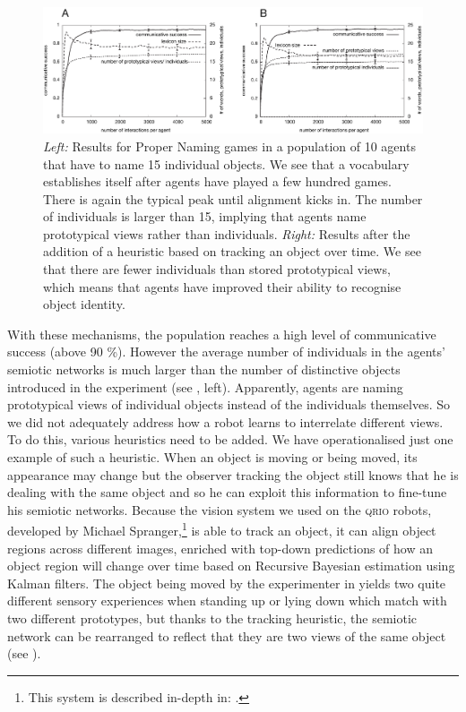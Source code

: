 \begin{figure}[htbp]
  \centerline{\includegraphics[width=\textwidth]{chap11/figs/png-results.pdf}}
\caption{\label{fig:png-results} 
{\itshape Left:} Results for Proper Naming games in a population of 10 agents that have to name 15 individual objects. 
We see that a vocabulary establishes
itself after agents have played a few hundred games. There is again the typical peak until alignment kicks in. 
The number of individuals is larger than 15, implying that agents name prototypical views rather than 
individuals. {\itshape Right:} Results after the addition  
of a heuristic based on tracking an object over time. We see that there are fewer individuals 
than stored prototypical views, which means that agents have improved their ability to recognise object 
identity. }
\end{figure}
With these mechanisms, the population reaches a high level of communicative success (above 90 \%). 
However the average number of individuals in the agents' semiotic networks
is much larger than the number of distinctive objects
introduced in the experiment (see , left). Apparently, agents are naming prototypical views of
individual objects instead of the individuals themselves. So we did not adequately address 
how a robot learns to interrelate different views. To do this, various heuristics need to be added. 
\clearpage
We have operationalised just one example of such a heuristic. When an object is moving or being moved,
its appearance may change but the observer tracking the object 
still knows that he is dealing with the same object and so he can
exploit this information to fine-tune his semiotic networks. Because the vision system we used on the \textsc{qrio} robots, developed 
by Michael Spranger,\footnote{
This system is described in-depth in: \cite{Spranger:2012vision}.} is able to track an object, it can align object
regions across different images, enriched with top-down predictions of
how an object region will change over time based on Recursive Bayesian
estimation using Kalman filters. The object being moved by 
the experimenter in  
yields two quite different sensory experiences when standing up or lying down which match with 
two different prototypes, but thanks to the tracking heuristic, the semiotic network can 
be rearranged to reflect that they are two views of the same object (see ). 


